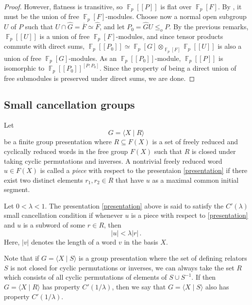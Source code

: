 \documentclass[a4paper]{amsart}
\theoremstyle{definition}
\theoremstyle{remark}
\DeclareMathOperator{\bbf}{\mathbb{F}}
\newcommand{\Falgebra}[1]{\bbf_p[#1]}
\newcommand{\FFalgebra}[1]{\bbf_p[\![#1]\!]}
\begin{document}
\begin{proof}
However, flatness is transitive, so \(\FFalgebra{P}\) is flat over \(\Falgebra{F}\). By \cite[Prop. 2.3.21]{cohnFreeIdealRings2006}, it must be the union of free \(\Falgebra{F}\)-modules. Choose now a normal open subgroup \(U\) of \(P\) such that \(U \cap \widehat{G} = \overline{F} \simeq \widehat{F}\), and let \(P_0 =\widehat{G}U \leq_o P\). By the previous remarks, \(\FFalgebra{U}\) is a union of free \(\Falgebra{F}\)-modules, and since tensor products commute with direct sums, \(\FFalgebra{P_0} \simeq \Falgebra{G} \otimes_{\Falgebra{F}} \FFalgebra{U}\) is also a union of free \(\Falgebra{G}\)-modules. As an \(\FFalgebra{P_0}\)-module, \(\FFalgebra{P}\) is isomorphic to \(\FFalgebra{P_0}^{[P\colon P_0]}\). Since the property of being a direct union of free submodules is preserved under direct sums, we are done.
\end{proof}
 
\subsection{Small cancellation groups}

Let
\begin{equation}\label{presentation}
  G = \langle X \mid R \rangle  
\end{equation}
be a finite group presentation where \(R \subseteq F(X)\) is a set of freely reduced and cyclically reduced words in the free group \(F(X)\) such that \(R\) is closed under taking cyclic permutations and inverses. A nontrivial freely reduced word \(u \in F(X)\) is called a \emph{piece} with respect to the presentaion \eqref{presentation} if there exist two distinct elements \(r_1, r_2 \in R\) that have \(u\) as a maximal common initial segment.

Let \(0 < \lambda < 1\). The presentation \eqref{presentation} above is said to satisfy the \(C'(\lambda)\) small cancellation condition if whenever \(u\) is a piece with respect to \eqref{presentation} and \(u \) is a subword of some \(r \in R\), then \[ |u| < \lambda |r|\,.\] Here, \(|v|\) denotes the length of a word \(v\) in the basis \(X\).

Note that if \(G = \langle X \mid S \rangle\) is a group presentation where the set of defining relators \( S \) is not closed for cyclic permutations or inverses, we can always take the set \( R \) which consists of all cyclic permutations of elements of \(S \cup S^{-1}\). If then \(G = \langle X \mid R \rangle\) has property \(C'(1/\lambda)\), then we say that \(G = \langle X \mid S \rangle\) also has property \(C'(1/\lambda)\).
\end{document}
